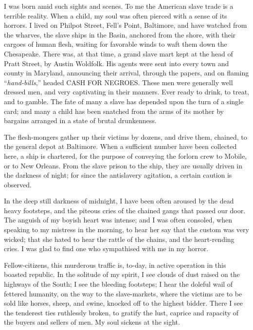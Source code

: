 I was born amid such sights and scenes. To me the American slave trade is a terrible reality. When a child, my soul was often pierced with a sense of its horrors. I lived on Philpot Street, Fell’s Point, Baltimore, and have watched from the wharves, the slave ships in the Basin, anchored from the shore, with their cargoes of human flesh, waiting for favorable winds to waft them down the Chesapeake. There was, at that time, a grand slave mart kept at the head of Pratt Street, by Austin Woldfolk. His agents were sent into every town and county in Maryland, announcing their arrival, through the papers, and on flaming “\textit{hand-bills},” headed CASH FOR NEGROES. These men were generally well dressed men, and very captivating in their manners. Ever ready to drink, to treat, and to gamble. The fate of many a slave has depended upon the turn of a single card; and many a child has been snatched from the arms of its mother by bargains arranged in a state of brutal drunkenness.\par

The flesh-mongers gather up their victims by dozens, and drive them, chained, to the general depot at Baltimore. When a sufficient number have been collected here, a ship is chartered, for the purpose of conveying the forlorn crew to Mobile, or to New Orleans. From the slave prison to the ship, they are usually driven in the darkness of night; for since the antislavery agitation, a certain caution is observed.\par

In the deep still darkness of midnight, I have been often aroused by the dead heavy footsteps, and the piteous cries of the chained gangs that passed our door. The anguish of my boyish heart was intense; and I was often consoled, when speaking to my mistress in the morning, to hear her say that the custom was very wicked; that she hated to hear the rattle of the chains, and the heart-rending cries. I was glad to find one who sympathised with me in my horror.\par

Fellow-citizens, this murderous traffic is, to-day, in active operation in this boasted republic. In the solitude of my spirit, I see clouds of dust raised on the highways of the South; I see the bleeding footsteps; I hear the doleful wail of fettered humanity, on the way to the slave-markets, where the victims are to be sold like horses, sheep, and swine, knocked off to the highest bidder. There I see the tenderest ties ruthlessly broken, to gratify the lust, caprice and rapacity of the buyers and sellers of men. My soul sickens at the sight.\par

